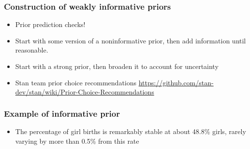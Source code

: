 \documentclass[10pt]{beamer}
\begin{document}
\begin{frame}
\frametitle{Construction of weakly informative priors}

  \begin{itemize}
      \item Prior prediction checks!
      \item Start with some version of a noninformative prior, then add  information until reasonable.
      \item Start with a strong prior, then broaden it to account for uncertainty
      \pause
    \item Stan team prior choice recommendations \url{https://github.com/stan-dev/stan/wiki/Prior-Choice-Recommendations}
  \end{itemize}

\end{frame}

\begin{frame}

  \frametitle{Example of informative prior}

  \begin{itemize}
  \item The percentage of girl births is remarkably stable at about
    48.8\% girls, rarely varying by more than 0.5\% from this rate
  \end{itemize}
  \begin{center}
  \end{center}
\end{frame}
\end{document}
